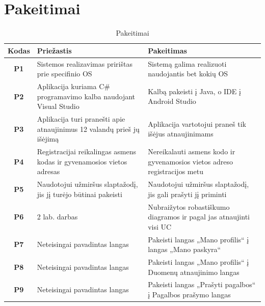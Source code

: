 \documentclass{VUMIFPSbakalaurinis}
\begin{document}
\printbibliography[heading=bibintoc]  %

\appendix
\section{Pakeitimai}
\begin{table}[H]\footnotesize
	\centering
	\caption{Pakeitimai}
	{
	\setlength{\arrayrulewidth}{0.25mm}
	{\begin{tabular}{|c|m{5.75cm}|m{5.75cm}|} \hline
		Kodas & Priežastis & Pakeitimas \\
		\hline
		\textbf{P1} & Sistemos realizavimas pririštas prie specifinio OS & Sistemą galima realizuoti naudojantis bet kokių OS \\
		\textbf{P2} & Aplikacija kuriama C\# programavimo kalba naudojant Visual Studio & Kalbą pakeisti į Java, o IDE į Android Studio \\
		\textbf{P3} & Aplikacija turi pranešti apie atnaujinimus 12 valandų prieš jų išėjimą & Aplikacija vartotojui praneš tik išėjus atnaujinimams \\
		\textbf{P4} & Registracijai reikalingas asmens kodas ir gyvenamosios vietos adresas & Nereikalauti asmens kodo ir gyvenamosios vietos adreso registracijos metu \\
		\textbf{P5} & Naudotojui užmiršus slaptažodį, jis jį turėjo būtinai pakeisti & Naudotojui užmiršus slaptažodį, jis gali prašyti jį priminti \\
		\textbf{P6} & 2 lab. darbas & Nubraižytos robastiškumo diagramos ir pagal jas atnaujinti visi UC \\
		\textbf{P7} & Neteisingai pavadintas langas & Pakeisti langas  „Mano profilis“ į  langas „Mano paskyra“ \\
		\textbf{P8} & Neteisingai pavadintas langas & Pakeisti langas  „Mano profilis“ į Duomenų atnaujinimo langas \\
		\textbf{P9} & Neteisingai pavadintas langas & Pakeisti langas  „Prašyti pagalbos“ į Pagalbos prašymo langas \\

\end{tabular}}}
\end{table}
\end{document}
